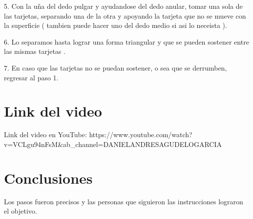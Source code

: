 \documentclass{article}
\begin{document}
5. Con la uña del dedo pulgar y ayudandose del dedo anular, tomar una sola de las tarjetas, separando una de la otra y apoyando la tarjeta que no se mueve con la superficie ( tambien puede hacer uno del dedo medio si asi lo neceista ).\newline \newline

6. Lo separamos hasta lograr una forma triangular y que se pueden sostener entre las mismas tarjetas . \newline \newline

7. En caso que las tarjetas no se puedan sostener, o sea que se derrumben, regresar al paso 1.
\newpage

\section{Link del video} \label{Link del video}

Link del video en YouTube: \newline https://www.youtube.com/watch?v=VCLgu94nFsM&ab_channel=DANIELANDRESAGUDELOGARCIA
 \newpage
 
\section{Conclusiones} \label{Conclusiones}

Los pasos fueron precisos y las personas que siguieron las instrucciones lograron el objetivo.
\end{document}
